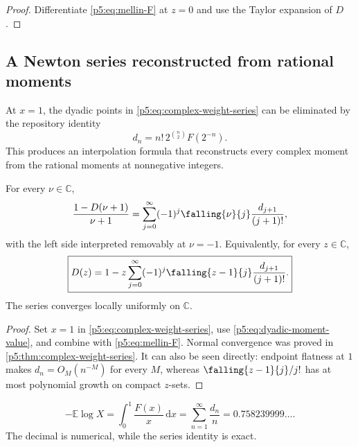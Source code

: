 \documentclass[11pt,oneside]{article}
\theoremstyle{definition}
\theoremstyle{remark}
\newcommand{\E}{\mathbb E}
\newcommand{\C}{\mathbb C}
\newcommand{\dd}{\,\mathrm d}
\newcommand{\1}{\mathbf 1}
\begin{document}
\begin{proof}
Differentiate \eqref{p5:eq:mellin-F} at $z=0$ and use the Taylor expansion of $D$.
\end{proof}

\subsection{A Newton series reconstructed from rational moments}

At $x=1$, the dyadic points in \eqref{p5:eq:complex-weight-series} can be eliminated by the repository identity
\begin{equation}\label{p5:eq:dyadic-moment-value}
 d_n=n!\,2^{\binom n2}F(2^{-n}).
\end{equation}
This produces an interpolation formula that reconstructs every complex moment from the rational moments at nonnegative integers.

\begin{corollary}\label{p5:cor:newton-mellin}
For every $\nu\in\C$,
\begin{equation}\label{p5:eq:newton-MF}
 \frac{1-D(\nu+1)}{\nu+1}
 =\sum_{j=0}^{\infty}(-1)^j\falling{\nu}{j}
 \frac{d_{j+1}}{(j+1)!},
\end{equation}
with the left side interpreted removably at $\nu=-1$.  Equivalently, for every $z\in\C$,
\begin{equation}\label{p5:eq:newton-D}
\boxed{
 D(z)=1-z\sum_{j=0}^{\infty}(-1)^j
 \falling{z-1}{j}\frac{d_{j+1}}{(j+1)!}.}
\end{equation}
The series converges locally uniformly on $\C$.
\end{corollary}

\begin{proof}
Set $x=1$ in \eqref{p5:eq:complex-weight-series}, use \eqref{p5:eq:dyadic-moment-value}, and combine with \eqref{p5:eq:mellin-F}.  Normal convergence was proved in \cref{p5:thm:complex-weight-series}.  It can also be seen directly: endpoint flatness at $1$ makes $d_n=O_M(n^{-M})$ for every $M$, whereas $\falling{z-1}{j}/j!$ has at most polynomial growth on compact $z$-sets.
\end{proof}

\begin{corollary}\label{p5:cor:log-constant-series}
\begin{equation}\label{p5:eq:log-constant-series}
 -\E\log X
 =\int_0^1\frac{F(x)}x\dd x
 =\sum_{n=1}^{\infty}\frac{d_n}{n}
 =0.758239999\ldots .
\end{equation}
The decimal is numerical, while the series identity is exact.
\end{corollary}
\end{document}

